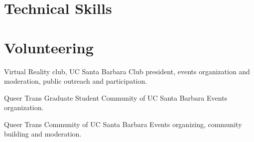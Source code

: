 \documentclass{scv}
\begin{document}
\section{Technical Skills}
\resumeSkillListStart
\resumeSkillListEnd

\section{Volunteering}
  \resumeSubHeadingListStart
  \resumeItemWithText
  {Virtual Reality club, UC Santa Barbara}
  {Club president, events organization and moderation, public outreach and participation.}
  \resumeSubHeadingListEnd

  \resumeSubHeadingListStart
  \resumeItemWithText
  {Queer Trans Graduate Student Community of UC Santa Barbara}
  {Events organization.}
  \resumeSubHeadingListEnd

  \resumeSubHeadingListStart
  \resumeItemWithText
  {Queer Trans Community of UC Santa Barbara}
  {Events organizing, community building and moderation.}
  \resumeSubHeadingListEnd
\end{document}

